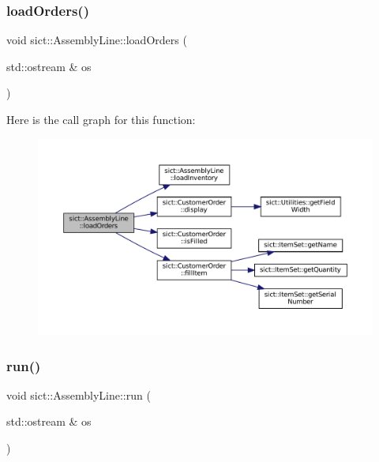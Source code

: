 \mbox{\label{classsict_1_1AssemblyLine_aa8f4560c9a29e2a623d2f5c661b26c94}} 
\subsubsection{\texorpdfstring{loadOrders()}{loadOrders()}}
{\footnotesize\ttfamily void sict\+::\+Assembly\+Line\+::load\+Orders (\begin{DoxyParamCaption}\item[{std\+::ostream \&}]{os }\end{DoxyParamCaption})}

Here is the call graph for this function\+:
\nopagebreak
\begin{figure}[H]
\begin{center}
\leavevmode
\includegraphics[width=350pt]{classsict_1_1AssemblyLine_aa8f4560c9a29e2a623d2f5c661b26c94_cgraph}
\end{center}
\end{figure}
\mbox{\label{classsict_1_1AssemblyLine_a4aa829576688cb8713ad66c1e2075cd9}} 
\subsubsection{\texorpdfstring{run()}{run()}}
{\footnotesize\ttfamily void sict\+::\+Assembly\+Line\+::run (\begin{DoxyParamCaption}\item[{std\+::ostream \&}]{os }\end{DoxyParamCaption})}

